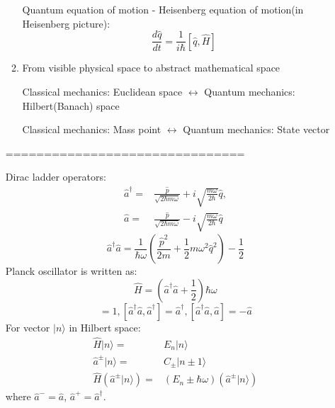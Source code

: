 \documentclass[12pt]{article}
\numberwithin{equation}{section}
\begin{document}
\begin{enumerate}
\begin{enumerate}
		{\color{red}Quantum equation of motion - Heisenberg equation of motion(in Heisenberg picture):
		\begin{equation}
			\frac{d\hat{q}}{dt}=\frac{1}{i\hbar}[\hat{q}, \hat{H}]
		\end{equation}} \par
	\item From {\color{blue}visible physical space} to {\color{red}abstract mathematical space} \par
		{\color{blue}Classical mechanics: Euclidean space} $\leftrightarrow$ {\color{red}Quantum mechanics: Hilbert(Banach) space} \par
		{\color{blue}Classical mechanics: Mass point} $\leftrightarrow$ {\color{red}Quantum mechanics: State vector}

	\end{enumerate}
	===============================\par
	Dirac ladder operators:
	\begin{equation}\begin{split}
		\hat{a}^\dag=&\frac{\hat{p}}{\sqrt{2\hbar m\omega}}+i\sqrt{\frac{m\omega}{2\hbar}}\hat{q},\\
		\hat{a}=&\frac{\hat{p}}{\sqrt{2\hbar m\omega}}-i\sqrt{\frac{m\omega}{2\hbar}}\hat{q}
	\end{split}\end{equation}
	\begin{equation}
		\hat{a}^\dag\hat{a}
		=\frac{1}{\hbar\omega}(\frac{\hat{p}^2}{2m}+\frac{1}{2}m\omega^2\hat{q}^2)-\frac{1}{2}
	\end{equation}
	Planck oscillator is written as:
	\begin{equation}
		\hat{H}=(\hat{a}^\dag\hat{a}+\frac{1}{2})\hbar\omega
	\end{equation}
	\begin{equation}
		[\hat{a},\hat{a}^\dag]=1,[\hat{a}^\dag\hat{a},\hat{a}^\dag]=\hat{a}^\dag,
	 	[\hat{a}^\dag\hat{a},\hat{a}]=-\hat{a}
	 \end{equation} 
	 For vector $|n\rangle$ in Hilbert space:
	 \begin{equation}\begin{split}
	 	\hat{H}|n\rangle=&E_n|n\rangle \\
	 	\hat{a}^\pm|n\rangle=&C_\pm|n\pm1\rangle \\
		 \hat{H}(\hat{a}^\pm|n\rangle)=&(E_n\pm\hbar\omega)(\hat{a}^\pm|n\rangle)
	 \end{split}\end{equation}
	 where $\hat{a}^-=\hat{a}$, $\hat{a}^+=\hat{a}^\dag$.

\end{enumerate}
\end{document}
